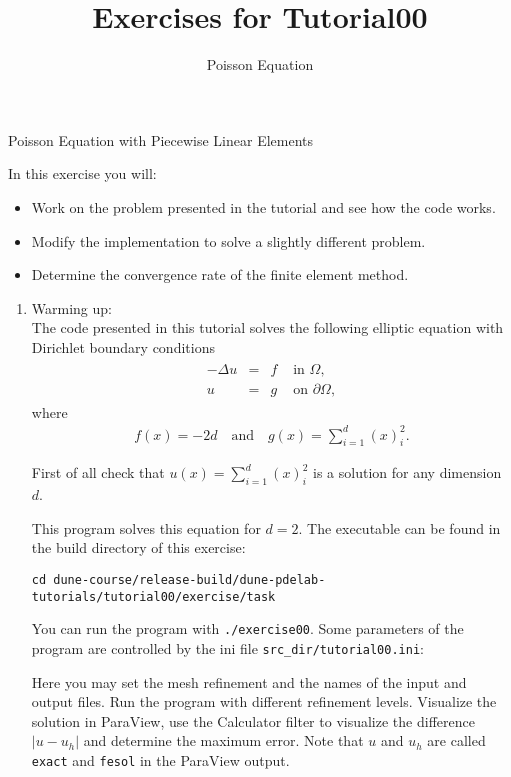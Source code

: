 \documentclass[12pt,a4paper]{article}
\title{\textbf{Exercises for Tutorial00}}
\subtitle{Poisson Equation}
\newcommand{\Laplace}{\Delta}
\begin{document}
\exerciseheader

\begin{Exercise}{Poisson Equation with Piecewise Linear Elements}

In this exercise you will:
\begin{itemize}
\item Work on the problem presented in the tutorial and see how the
  code works.
\item Modify the implementation to solve a slightly different problem.
\item Determine the convergence rate of the finite element method.
\end{itemize}

\begin{enumerate}
\item {\sc Warming up}:\\
  The code presented in this tutorial solves the following elliptic
  equation with Dirichlet boundary conditions
  \begin{align*}
    \begin{array}{rcll}
      -\Laplace u  & = & f & \text{ in } \Omega, \\
      u & = & g & \text{ on } \partial\Omega,
    \end{array}
  \end{align*}
  where
  \begin{align*}
    f(x) = -2d \quad\text{and}\quad  g(x) = \sum_{i=1}^d (x)_i^2.
  \end{align*}

  First of all check that $u(x) = \sum_{i=1}^d (x)_i^2$ is a solution
  for any dimension $d$.

  This program solves this equation for $d=2$. The executable can be
  found in the build directory of this exercise:
  \begin{lstlisting}
cd dune-course/release-build/dune-pdelab-tutorials/tutorial00/exercise/task
  \end{lstlisting}
  You can run the program with \lstinline{./exercise00}.  Some
  parameters of the program are controlled by the ini file
  \lstinline{src_dir/tutorial00.ini}:
  

  Here you may set the mesh refinement and the names of the input and
  output files. Run the program with different refinement
  levels. Visualize the solution in ParaView, use the Calculator
  filter to visualize the difference $|u-u_h|$ and determine the
  maximum error. Note that $u$ and $u_h$ are called \lstinline{exact}
  and \lstinline{fesol} in the ParaView output.


\end{enumerate}
\end{Exercise}
\end{document}
